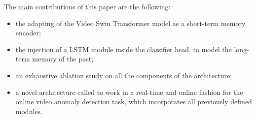 The main contributions of this paper are the following:
\begin{itemize}
    \item the adapting of the Video Swin Transformer model \cite{liu_video_2022} as a short-term memory encoder;
    \item the injection of a LSTM module inside the classifier head, to model the long-term memory of the past;
    \item an exhaustive ablation study on all the components of the architecture;
    \item a novel architecture called  to work in a real-time and online fashion for the online video anomaly detection task, which incorporates all previously defined modules.
\end{itemize} 


